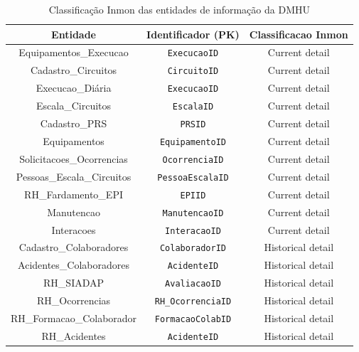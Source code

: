 \documentclass[12pt,a4paper,final]{article}
\begin{document}
    \begin{table}[H]
        \centering
        \caption{Classificação Inmon das entidades de informação da DMHU}
        \label{tab:inmon}
        \begin{tabular}{@{}|c|c|c|@{}}
            \toprule
            \textbf{Entidade} & \textbf{Identificador (PK)} & \textbf{Classificacao Inmon}\\\midrule
            Equipamentos\_Execucao          & \texttt{ExecucaoID}         & Current detail\\
            Cadastro\_Circuitos             & \texttt{CircuitoID}         & Current detail\\
            Execucao\_Diária                & \texttt{ExecucaoID}         & Current detail\\
            Escala\_Circuitos               & \texttt{EscalaID}           & Current detail\\
            Cadastro\_PRS                   & \texttt{PRSID}             & Current detail\\
            Equipamentos                    & \texttt{EquipamentoID}      & Current detail\\
            Solicitacoes\_Ocorrencias       & \texttt{OcorrenciaID}       & Current detail\\
            Pessoas\_Escala\_Circuitos      & \texttt{PessoaEscalaID}     & Current detail\\
            RH\_Fardamento\_EPI             & \texttt{EPIID}              & Current detail\\
            Manutencao                      & \texttt{ManutencaoID}       & Current detail\\
            Interacoes                      & \texttt{InteracaoID}        & Current detail\\
            Cadastro\_Colaboradores         & \texttt{ColaboradorID}      & Historical detail\\
            Acidentes\_Colaboradores        & \texttt{AcidenteID}         & Historical detail\\
            RH\_SIADAP                       & \texttt{AvaliacaoID}        & Historical detail\\
            RH\_Ocorrencias                 & \texttt{RH\_OcorrenciaID}   & Historical detail\\
            RH\_Formacao\_Colaborador       & \texttt{FormacaoColabID}    & Historical detail\\
            RH\_Acidentes                   & \texttt{AcidenteID}          & Historical detail\\

\end{tabular}
\end{table}
\end{document}
